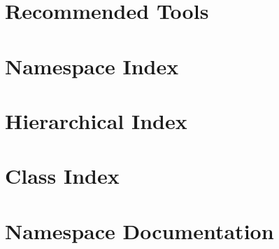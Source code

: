 \documentclass[twoside]{book}
\newcommand{\+}{\discretionary{\mbox{\scriptsize$\hookleftarrow$}}{}{}}
\begin{document}
\chapter{Recommended Tools}
\label{md_docs__s_u_p_p_l_e_m_e_n_t__r_e_a_d_m_e}

\chapter{Namespace Index}

\chapter{Hierarchical Index}

\chapter{Class Index}

\chapter{Namespace Documentation}

\end{document}
